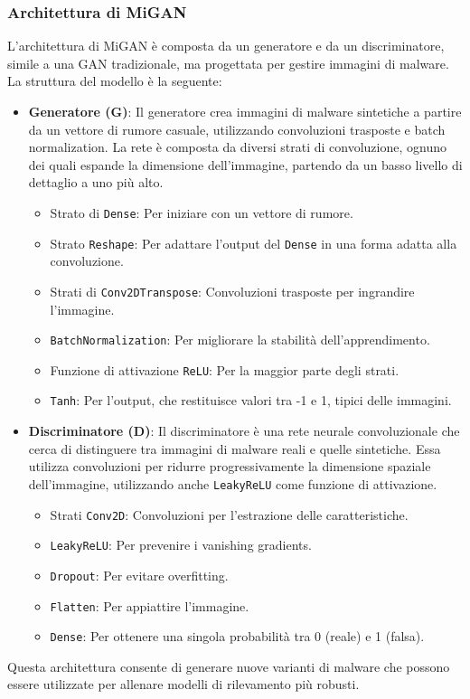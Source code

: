 \subsubsection{Architettura di MiGAN}
L'architettura di MiGAN è composta da un generatore e da un discriminatore, simile a una GAN tradizionale, ma progettata per gestire immagini di malware. La struttura del modello è la seguente:
\begin{itemize}
    \item \textbf{Generatore (G)}: Il generatore crea immagini di malware sintetiche a partire da un vettore di rumore casuale, utilizzando convoluzioni trasposte e batch normalization. La rete è composta da diversi strati di convoluzione, ognuno dei quali espande la dimensione dell'immagine, partendo da un basso livello di dettaglio a uno più alto. 
    \begin{itemize}
        \item Strato di \texttt{Dense}: Per iniziare con un vettore di rumore.
        \item Strato \texttt{Reshape}: Per adattare l'output del \texttt{Dense} in una forma adatta alla convoluzione.
        \item Strati di \texttt{Conv2DTranspose}: Convoluzioni trasposte per ingrandire l'immagine.
        \item \texttt{BatchNormalization}: Per migliorare la stabilità dell'apprendimento.
        \item Funzione di attivazione \texttt{ReLU}: Per la maggior parte degli strati.
        \item \texttt{Tanh}: Per l'output, che restituisce valori tra -1 e 1, tipici delle immagini.
    \end{itemize}
    \item \textbf{Discriminatore (D)}: Il discriminatore è una rete neurale convoluzionale che cerca di distinguere tra immagini di malware reali e quelle sintetiche. Essa utilizza convoluzioni per ridurre progressivamente la dimensione spaziale dell'immagine, utilizzando anche \texttt{LeakyReLU} come funzione di attivazione.
    \begin{itemize}
        \item Strati \texttt{Conv2D}: Convoluzioni per l'estrazione delle caratteristiche.
        \item \texttt{LeakyReLU}: Per prevenire i vanishing gradients.
        \item \texttt{Dropout}: Per evitare overfitting.
        \item \texttt{Flatten}: Per appiattire l'immagine.
        \item \texttt{Dense}: Per ottenere una singola probabilità tra 0 (reale) e 1 (falsa).
    \end{itemize}
\end{itemize}
Questa architettura consente di generare nuove varianti di malware che possono essere utilizzate per allenare modelli di rilevamento più robusti.

